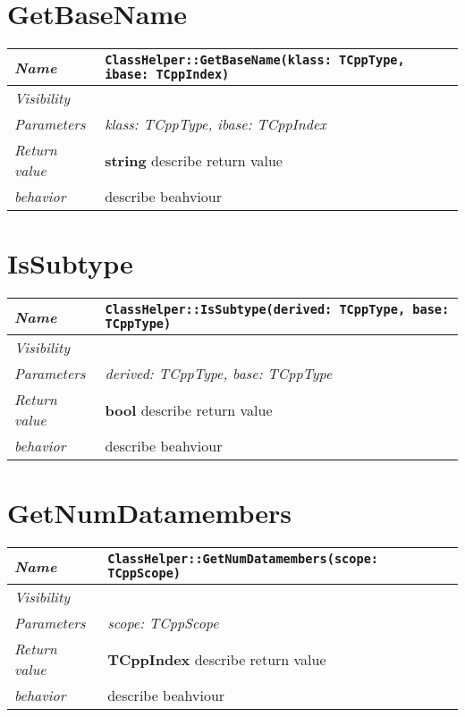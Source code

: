  \section{GetBaseName}
\begin{longtable}{p{3cm} @{\hskip 1cm} p{12cm}}
 \hline
\textit{Name} & \texttt{ClassHelper::GetBaseName(klass: TCppType, ibase: TCppIndex)}\\
\hline
 \textit{Visibility} & \\
\hline
\textit{Parameters} & \textit{klass: TCppType, ibase: TCppIndex}\\
\hline
\textit{Return value} & \textbf{ string} describe return value\\
  \hline
 \textit{behavior} & describe beahviour \\
\hline
\end{longtable} \pagebreak
 \section{IsSubtype}
\begin{longtable}{p{3cm} @{\hskip 1cm} p{12cm}}
 \hline
\textit{Name} & \texttt{ClassHelper::IsSubtype(derived: TCppType, base: TCppType)}\\
\hline
 \textit{Visibility} & \\
\hline
\textit{Parameters} & \textit{derived: TCppType, base: TCppType}\\
\hline
\textit{Return value} & \textbf{ bool} describe return value\\
  \hline
 \textit{behavior} & describe beahviour \\
\hline
\end{longtable} \pagebreak
 \section{GetNumDatamembers}
\begin{longtable}{p{3cm} @{\hskip 1cm} p{12cm}}
 \hline
\textit{Name} & \texttt{ClassHelper::GetNumDatamembers(scope: TCppScope)}\\
\hline
 \textit{Visibility} & \\
\hline
\textit{Parameters} & \textit{scope: TCppScope}\\
\hline
\textit{Return value} & \textbf{ TCppIndex} describe return value\\
  \hline
 \textit{behavior} & describe beahviour \\
\hline
\end{longtable} \pagebreak
